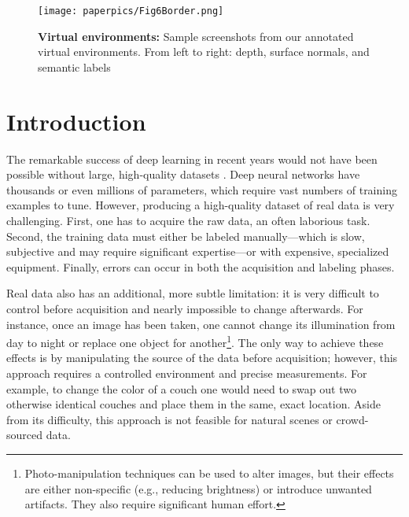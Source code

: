\documentclass[runningheads]{llncs}
\begin{document}
\begin{figure}[htbp]
\centerline{\texttt{[image: paperpics/Fig6Border.png]}}
\caption{\textbf{Virtual environments:} Sample screenshots from our annotated virtual environments. From left to right: depth, surface normals, and semantic labels}
\label{fig:envexamples}
\vspace{-1em}
\end{figure}

\section{Introduction}


The remarkable success of deep learning in recent years would not have been possible without large, high-quality datasets \cite{LeCun2015}. Deep neural networks have thousands or even millions of parameters, which require vast numbers of training examples to tune. However, producing a high-quality dataset of real data is very challenging. First, one has to acquire the raw data, an often laborious task. Second, the training data must either be labeled manually---which is slow, subjective and may require significant expertise---or with expensive, specialized equipment. Finally, errors can occur in both the acquisition and labeling phases.










Real data also has an additional, more subtle limitation: it is very difficult to control before acquisition and nearly impossible to change afterwards. For instance, once an image has been taken, one cannot change its illumination from day to night or replace one object for another\footnote{Photo-manipulation techniques can be used to alter images, but their effects are either non-specific (e.g., reducing brightness) or introduce unwanted artifacts. They also require significant human effort.}. The only way to achieve these effects is by manipulating the source of the data before acquisition; however, this approach requires a controlled environment and precise measurements. For example, to change the color of a couch one would need to swap out two otherwise identical couches and place them in the same, exact location. Aside from its difficulty, this approach is not feasible for natural scenes or crowd-sourced data.
\end{document}
